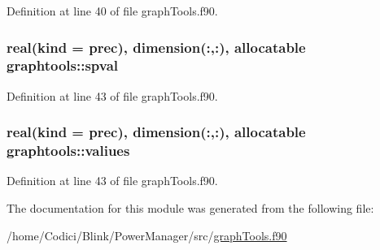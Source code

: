 Definition at line 40 of file graph\-Tools.\-f90.

\hypertarget{classgraphtools_aa469ea301df7677b90448dfa88f26153}{
\subsubsection[{spval}]{\setlength{\rightskip}{0pt plus 5cm}real(kind = prec), dimension(\-:,\-:), allocatable graphtools\-::spval}}\label{classgraphtools_aa469ea301df7677b90448dfa88f26153}


Definition at line 43 of file graph\-Tools.\-f90.

\hypertarget{classgraphtools_a637c15ec541e2e87680f381c2a542e27}{
\subsubsection[{valiues}]{\setlength{\rightskip}{0pt plus 5cm}real(kind = prec), dimension(\-:,\-:), allocatable graphtools\-::valiues}}\label{classgraphtools_a637c15ec541e2e87680f381c2a542e27}


Definition at line 43 of file graph\-Tools.\-f90.



The documentation for this module was generated from the following file\-:\begin{DoxyCompactItemize}
\item 
/home/\-Codici/\-Blink/\-Power\-Manager/src/\hyperlink{graph_tools_8f90}{graph\-Tools.\-f90}\end{DoxyCompactItemize}
